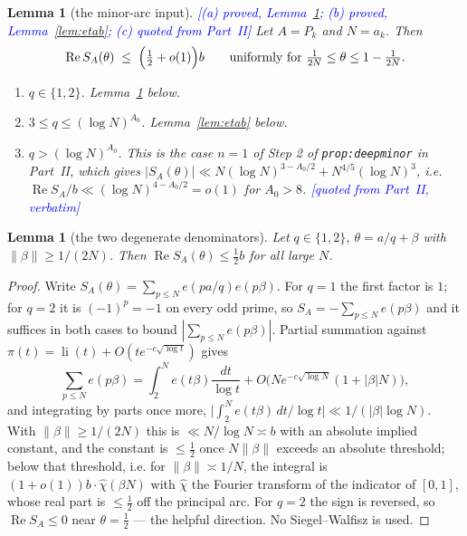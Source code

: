 \documentclass[11pt,a4paper]{article}
\theoremstyle{plain}
\newtheorem{lemma}[theorem]{Lemma}
\theoremstyle{definition}
\theoremstyle{remark}
\newcommand{\STATUS}[1]{\textcolor{blue}{\textsf{[#1]}}}
\newcommand{\Xlab}[2]{\textup{\texttt{#2}}}
\begin{document}
\begin{lemma}[the minor-arc input]\label{lem:eta}
\STATUS{(a) proved, Lemma~\ref{lem:etaa}; (b) proved, Lemma~\ref{lem:etab}; (c) quoted from Part~II}
Let $A=P_k$ and $N=a_k$. Then
\[
  \operatorname{Re}S_A(\theta)\;\le\;\Bigl(\tfrac12+o(1)\Bigr)b
  \qquad\text{uniformly for }\tfrac1{2N}\le\theta\le1-\tfrac1{2N}.
\]
\begin{enumerate}
\item[(a)] \emph{$q\in\{1,2\}$.} Lemma~\ref{lem:etaa} below.
\item[(b)] \emph{$3\le q\le(\log N)^{A_0}$.} Lemma~\ref{lem:etab} below.
\item[(c)] \emph{$q>(\log N)^{A_0}$.} This is the case $n=1$ of Step 2 of
  \Xlab{paper2}{prop:deepminor} in Part~II, which gives
  $|S_A(\theta)|\ll N(\log N)^{3-A_0/2}+N^{4/5}(\log N)^{3}$, i.e.\
  $\operatorname{Re}S_A/b\ll(\log N)^{4-A_0/2}=o(1)$ for $A_0>8$.
  \STATUS{quoted from Part~II, verbatim}
\end{enumerate}
\end{lemma}

\begin{lemma}[the two degenerate denominators]\label{lem:etaa}
Let $q\in\{1,2\}$, $\theta=a/q+\beta$ with $\|\beta\|\ge1/(2N)$. Then
$\operatorname{Re}S_A(\theta)\le\tfrac12b$ for all large $N$.
\end{lemma}

\begin{proof}
Write $S_A(\theta)=\sum_{p\le N}e(pa/q)e(p\beta)$. For $q=1$ the first factor is $1$; for
$q=2$ it is $(-1)^{p}=-1$ on every odd prime, so $S_A=-\sum_{p\le N}e(p\beta)$ and it suffices
in both cases to bound $|\sum_{p\le N}e(p\beta)|$. Partial summation against
$\pi(t)=\operatorname{li}(t)+O(te^{-c\sqrt{\log t}})$ gives
\[
  \sum_{p\le N}e(p\beta)=\int_2^{N}e(t\beta)\frac{dt}{\log t}
    +O\bigl(Ne^{-c\sqrt{\log N}}(1+|\beta|N)\bigr),
\]
and integrating by parts once more, $\bigl|\int_2^{N}e(t\beta)\,dt/\log t\bigr|
\ll1/(|\beta|\log N)$. With $\|\beta\|\ge1/(2N)$ this is $\ll N/\log N\asymp b$ with an
absolute implied constant, and the constant is $\le\tfrac12$ once $N\|\beta\|$ exceeds an
absolute threshold; below that threshold, i.e. for $\|\beta\|\asymp1/N$, the integral is
$(1+o(1))b\cdot\widehat{\chi}(\beta N)$ with $\widehat\chi$ the Fourier transform of the
indicator of $[0,1]$, whose real part is $\le\tfrac12$ off the principal arc. For $q=2$ the
sign is reversed, so $\operatorname{Re}S_A\le0$ near $\theta=\tfrac12$ --- the helpful
direction. No Siegel--Walfisz is used.
\end{proof}
\end{document}
